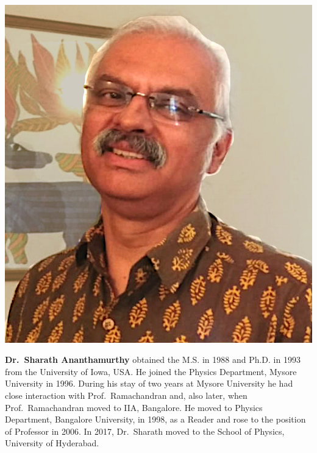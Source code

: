 \centerline{\includegraphics[scale=.42]{authorsphotos/Sharath_Ananthamurthy1.jpg}}
\medskip

\noindent
\textbf{Dr.\ Sharath Ananthamurthy} obtained the M.S. in 1988 and Ph.D. in 1993 from the University of Iowa, USA. He joined the Physics Department, Mysore University in 1996. During his stay of two years at Mysore University he had close interaction with Prof.\ Ramachandran and, also later, when Prof.\ Ramachandran moved to IIA, Bangalore. He moved to Physics Department, Bangalore University, in 1998, as a Reader and rose to the position of Professor in 2006. In 2017, Dr.\ Sharath moved to the School of Physics, University of Hyderabad.
